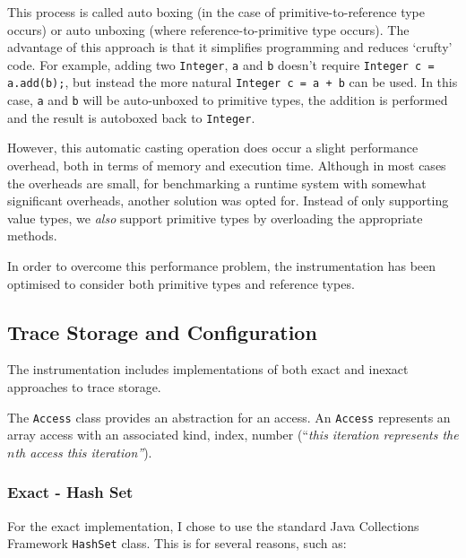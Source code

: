 		This process is called auto boxing (in the case of primitive-to-reference type occurs) or auto unboxing (where reference-to-primitive type occurs). The advantage of this approach is that it simplifies programming and reduces `crufty' code. For example, adding two \texttt{Integer}, \texttt{a} and \texttt{b} doesn't require \texttt{Integer c = a.add(b);}, but instead the more natural \texttt{Integer c = a + b} can be used. In this case, \texttt{a} and \texttt{b} will be auto-unboxed to primitive types, the addition is performed and the result is autoboxed back to \texttt{Integer}.
		
		However, this automatic casting operation does occur a slight performance overhead, both in terms of memory and execution time. Although in most cases the overheads are small, for benchmarking a runtime system with somewhat significant overheads, another solution was opted for. Instead of only supporting value types, we \emph{also} support primitive types by overloading the appropriate methods. 
		
		In order to overcome this performance problem, the instrumentation has been optimised to consider both primitive types and reference types.
	
	\subsection{Trace Storage and Configuration} \label{sec:runtime/implementation/trace}
	The instrumentation includes implementations of both exact and inexact approaches to trace storage.
	
	The \texttt{Access} class provides an abstraction for an access. An \texttt{Access} represents an array access with an associated kind, index, number (``\textit{this iteration represents the $n$th access this iteration''}).
	
		\subsubsection{Exact - Hash Set} \label{sec:runtime/implementation/trace/hashset}
		For the exact implementation, I chose to use the standard Java Collections Framework \texttt{HashSet} class. This is for several reasons, such as:
		
